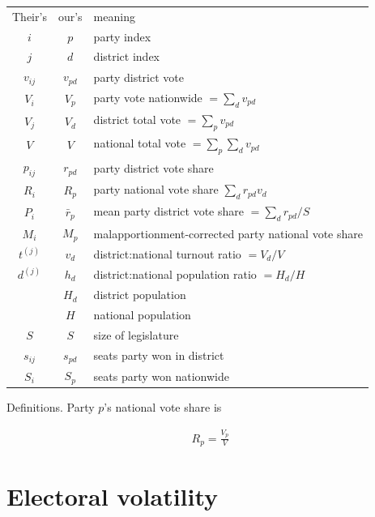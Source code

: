 \documentclass[letter,12pt]{article}
\begin{document}
\begin{tabular}{ccl}
Their's   &   our's        &  meaning \\
$i$       &   $p$          &  party index  \\
$j$       &   $d$          &  district index  \\
$v_{ij}$   &  $v_{pd}$       & party district vote   \\
$V_i$     &   $V_p$        &  party vote nationwide $= \sum_{d} v_{pd}$   \\
$V_j$     &   $V_d$        &  district total vote $= \sum_{p} v_{pd}$     \\
$V$       &    $V$        &   national total vote $= \sum_{p} \sum_{d} v_{pd}$    \\
$p_{ij}$   &  $r_{pd}$      & party district vote share  \\
$R_i$     &   $R_p$        &  party national vote share $\sum_d r_{pd} v_d$ \\
$P_i$     &   $\bar{r}_p$  & mean party district vote share $= \sum_{d} r_{pd} / S$  \\
$M_i$     &   $M_p$        &  malapportionment-corrected party national vote share  \\
$t^{(j)}$  & $v_d$          &  district:national turnout ratio  $= V_d / V$\\
$d^{(j)}$  & $h_d$          &  district:national population ratio $= H_d/H$ \\
          &  $H_d$         &  district population   \\
          &  $H$           &   national population  \\
$S$       &    $S$         &   size of legislature  \\
$s_{ij}$   &  $s_{pd}$       & seats party won in district  \\
$S_i$     &   $S_p$         &  seats party won nationwide  \\
\end{tabular}

Definitions. Party $p$'s national vote share is 

\begin{align*}
R_p = \frac{V_p}{V}
\end{align*}

\section{Electoral volatility}
\end{document}
